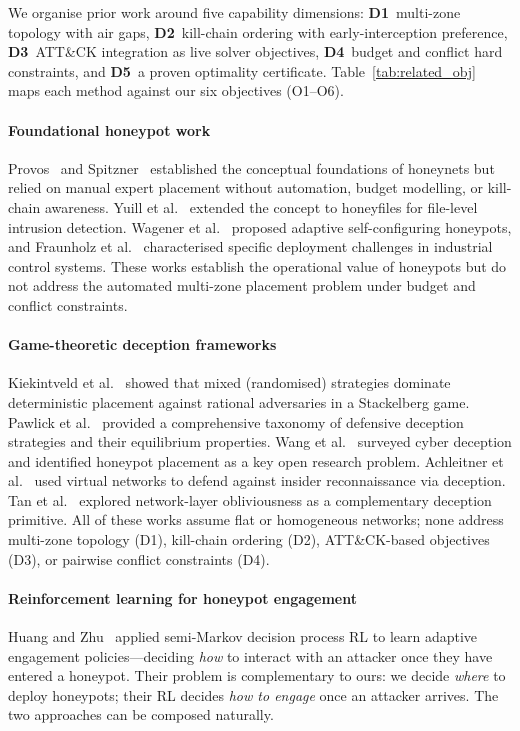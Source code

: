 \documentclass[journal]{IEEEtran}
\begin{document}
We organise prior work around five capability dimensions:
\textbf{D1}~multi-zone topology with air gaps, \textbf{D2}~kill-chain
ordering with early-interception preference, \textbf{D3}~ATT\&CK
integration as live solver objectives, \textbf{D4}~budget and
conflict hard constraints, and \textbf{D5}~a proven optimality
certificate. Table~\ref{tab:related_obj} maps each method against our
six objectives (O1--O6).

\paragraph{Foundational honeypot work}
Provos~\cite{provos2004} and Spitzner~\cite{spitzner2003} established
the conceptual foundations of honeynets but relied on manual expert
placement without automation, budget modelling, or kill-chain
awareness. Yuill et al.~\cite{yuill2004} extended the concept to
honeyfiles for file-level intrusion detection. Wagener et
al.~\cite{wagener2009} proposed adaptive self-configuring honeypots,
and Fraunholz et al.~\cite{fraunholz2017} characterised specific
deployment challenges in industrial control systems. These works
establish the operational value of honeypots but do not address the
automated multi-zone placement problem under budget and conflict
constraints.

\paragraph{Game-theoretic deception frameworks}
Kiekintveld et al.~\cite{kiekintveld2015} showed that mixed (randomised)
strategies dominate deterministic placement against rational adversaries
in a Stackelberg game. Pawlick et al.~\cite{pawlick2019} provided a
comprehensive taxonomy of defensive deception strategies and their
equilibrium properties. Wang et al.~\cite{wang2018} surveyed cyber
deception and identified honeypot placement as a key open research
problem. Achleitner et al.~\cite{achleitner2017} used virtual networks
to defend against insider reconnaissance via deception. Tan et
al.~\cite{tan2011} explored network-layer obliviousness as a
complementary deception primitive. All of these works assume flat or
homogeneous networks; none address multi-zone topology (D1),
kill-chain ordering (D2), ATT\&CK-based objectives (D3), or
pairwise conflict constraints (D4).

\paragraph{Reinforcement learning for honeypot engagement}
Huang and Zhu~\cite{huang2019} applied semi-Markov decision process
RL to learn adaptive engagement policies---deciding \emph{how} to
interact with an attacker once they have entered a honeypot. Their
problem is complementary to ours: we decide \emph{where} to deploy
honeypots; their RL decides \emph{how to engage} once an attacker
arrives. The two approaches can be composed naturally.
\end{document}
